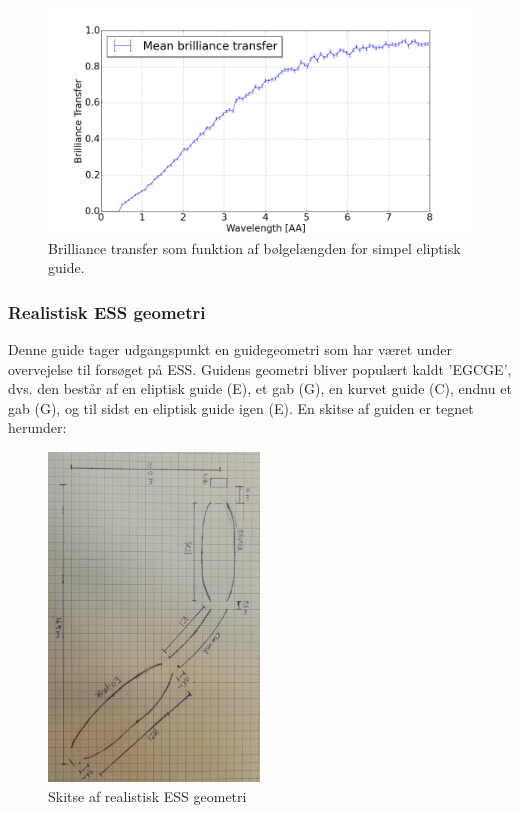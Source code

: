 \documentclass[12pt,oneside,a4paper]{article}
\begin{document}
{{{{{\begin{figure}[H]
\centering
\includegraphics[width=1\textwidth]{optimized_mean_4.png}
\caption{Brilliance transfer som funktion af bølgelængden for simpel eliptisk guide.}
\end{figure}




\subsubsection{Realistisk ESS geometri}
Denne guide tager udgangspunkt en guidegeometri som har været under overvejelse til forsøget på ESS. Guidens geometri bliver populært kaldt 'EGCGE', dvs. den består af en eliptisk guide (E), et gab (G), en kurvet guide (C), endnu et gab (G), og til sidst en eliptisk guide igen (E). En skitse af guiden er tegnet herunder:

\begin{figure}[H]
\centering
\includegraphics[width=0.5\textwidth, angle=90]{EGCGE.JPG}
\caption{Skitse af realistisk ESS geometri}
\end{figure}

}}}}}
\end{document}

